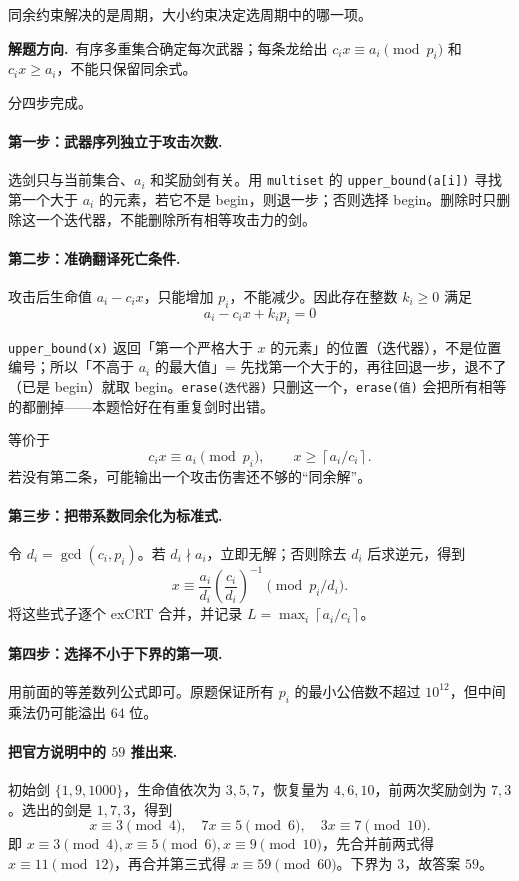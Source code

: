 \documentclass[UTF8,a4paper,11pt,twoside,openright,fontset=fandol]{ctexbook}
\theoremstyle{definition}
\newcommand{\ceil}[1]{\left\lceil #1\right\rceil}
\newcommand{\hint}{\par\noindent\textbf{解题方向.}\ }
\begin{document}
同余约束解决的是周期，大小约束决定选周期中的哪一项。


\hint 有序多重集合确定每次武器；每条龙给出 $c_ix\equiv a_i\pmod{p_i}$ 和 $c_ix\ge a_i$，不能只保留同余式。

分四步完成。
\paragraph{第一步：武器序列独立于攻击次数.}
选剑只与当前集合、$a_i$ 和奖励剑有关。用 \texttt{multiset} 的 \texttt{upper\_bound(a[i])} 寻找第一个大于 $a_i$ 的元素，若它不是 begin，则退一步；否则选择 begin。删除时只删除这一个迭代器，不能删除所有相等攻击力的剑。

\paragraph{第二步：准确翻译死亡条件.}
攻击后生命值 $a_i-c_ix$，只能增加 $p_i$，不能减少。因此存在整数 $k_i\ge0$ 满足
\[
 a_i-c_ix+k_ip_i=0
\]

\begin{tip}[两个容器术语]
\texttt{upper\_bound(x)} 返回「第一个严格大于 $x$ 的元素」的位置（迭代器），不是位置编号；所以「不高于 $a_i$ 的最大值」= 先找第一个大于的，再往回退一步，退不了（已是 begin）就取 begin。\texttt{erase(迭代器)} 只删这一个，\texttt{erase(值)} 会把所有相等的都删掉——本题恰好在有重复剑时出错。
\end{tip}

等价于
\[
 c_ix\equiv a_i\pmod{p_i},\qquad x\ge\ceil{a_i/c_i}.
\]
若没有第二条，可能输出一个攻击伤害还不够的“同余解”。

\paragraph{第三步：把带系数同余化为标准式.}
令 $d_i=\gcd(c_i,p_i)$。若 $d_i\nmid a_i$，立即无解；否则除去 $d_i$ 后求逆元，得到
\[
 x\equiv \frac{a_i}{d_i}\left(\frac{c_i}{d_i}\right)^{-1}
 \pmod{p_i/d_i}.
\]
将这些式子逐个 exCRT 合并，并记录 $L=\max_i\ceil{a_i/c_i}$。
\paragraph{第四步：选择不小于下界的第一项.}
用前面的等差数列公式即可。原题保证所有 $p_i$ 的最小公倍数不超过 $10^{12}$，但中间乘法仍可能溢出 $64$ 位。

\paragraph{把官方说明中的 $59$ 推出来.}
初始剑 $\{1,9,1000\}$，生命值依次为 $3,5,7$，恢复量为 $4,6,10$，前两次奖励剑为 $7,3$。选出的剑是 $1,7,3$，得到
\[
 x\equiv3\pmod4,\quad7x\equiv5\pmod6,\quad3x\equiv7\pmod{10}.
\]
即 $x\equiv3\pmod4,x\equiv5\pmod6,x\equiv9\pmod{10}$，先合并前两式得 $x\equiv11\pmod{12}$，再合并第三式得 $x\equiv59\pmod{60}$。下界为 $3$，故答案 $59$。
\end{document}
